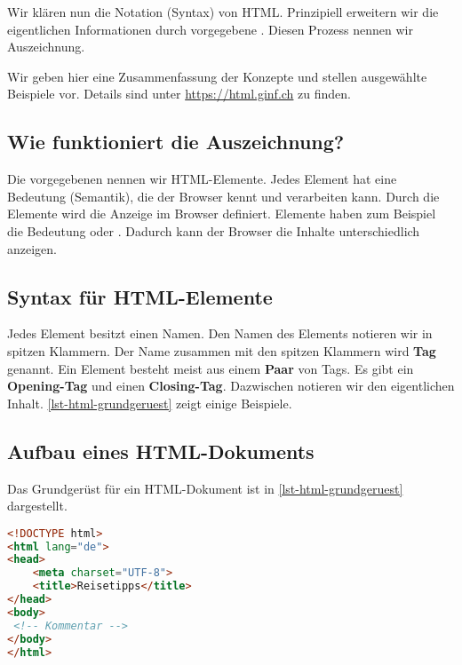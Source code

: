 Wir klären nun die Notation (Syntax) von \ac{HTML}. Prinzipiell erweitern wir die eigentlichen Informationen durch vorgegebene . Diesen Prozess nennen wir Auszeichnung.

\begin{hinweis}
Wir geben hier  eine Zusammenfassung der Konzepte und stellen ausgewählte Beispiele vor. Details sind unter \url{https://html.ginf.ch} zu finden.
\end{hinweis}

\subsection{Wie funktioniert die Auszeichnung?}

Die vorgegebenen  nennen wir \ac{HTML}-Elemente. Jedes Element hat eine Bedeutung (Semantik), die der Browser kennt und verarbeiten kann. Durch die Elemente wird die Anzeige im Browser definiert. Elemente haben zum Beispiel die Bedeutung  oder . Dadurch kann der Browser die Inhalte unterschiedlich anzeigen.

\subsection{Syntax für \acs{HTML}-Elemente}

Jedes Element besitzt einen Namen. Den Namen des Elements notieren wir in spitzen Klammern. Der Name zusammen mit den spitzen Klammern wird \textbf{Tag} genannt. Ein Element besteht meist aus einem \textbf{Paar} von Tags. Es gibt ein \textbf{Opening-Tag} und einen \textbf{Closing-Tag}. Dazwischen notieren wir den eigentlichen Inhalt. \autoref{lst-html-grundgeruest} zeigt einige Beispiele.

\subsection{Aufbau eines \acs{HTML}-Dokuments}

Das Grundgerüst für ein \ac{HTML}-Dokument ist in \autoref{lst-html-grundgeruest} dargestellt.

\begin{lstlisting}[language=HTML, caption={Grundgerüst}, label={lst-html-grundgeruest}]
<!DOCTYPE html>
<html lang="de">
<head>
    <meta charset="UTF-8">
    <title>Reisetipps</title>
</head>
<body>
 <!-- Kommentar -->
</body>
</html>
\end{lstlisting}

